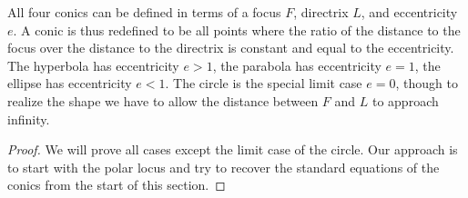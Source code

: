 \documentclass[fleqn,letterpaper]{report}
\begin{document}
\begin{prop}
\label{prop-conic-eccentricity}
All four conics can be defined in terms of a focus $F$,
directrix $L$, and eccentricity $e$. A conic is thus redefined
to be all points where the ratio of the distance to the focus
over the distance to the directrix is constant and equal to
the eccentricity. The hyperbola has eccentricity $e>1$, the
parabola has eccentricity $e=1$, the ellipse has eccentricity
$e<1$. The circle is the special limit case $e=0$, though to
realize the shape we have to allow the distance between $F$
and $L$ to approach infinity.
\end{prop}

\begin{proof}
We will prove all cases except the limit case of the circle.
Our approach is to start with the polar locus and try to
recover the standard equations of the conics from the start of
this section.


\end{proof}
\end{document}
